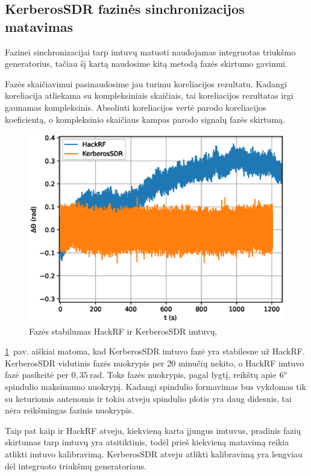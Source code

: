 \documentclass[main.tex]{subfiles}
\begin{document}
\subsection{KerberosSDR fazinės sinchronizacijos matavimas}\label{sec:phase_stability_sdr}

Fazinei sinchronizacijai tarp imtuvų matuoti naudojamas integruotas triukšmo generatorius,
tačiau šį kartą naudosime kitą metodą fazės skirtumo gavimui.

Fazės skaičiavimui pasinaudosime jau turimu koreliacijos rezultatu. Kadangi koreliacija
atliekama su kompleksiniais skaičiais, tai koreliacijos rezultatas irgi gaunamas kompleksinis.
Absoliuti koreliacijos vertė parodo koreliacijos koeficientą, o kompleksinio skaičiaus kampas
parodo signalų fazės skirtumą.

\begin{figure}[h]
    \begin{centering}
    \includegraphics[scale=1.0]{drawings/hackrdf_vs_kerberos_phase_over_time.eps}
    \par\end{centering}
    \protect\caption{\label{fig:phase_stability}Fazės stabilumas HackRF ir KerberosSDR imtuvų.}
\end{figure}

\ref{fig:phase_stability}~pav. aiškiai matoma, kad KerberosSDR imtuvo fazė yra 
stabilesne už HackRF. KerberosSDR vidutinis fazės nuokrypis per 20 minučių nekito,
o HackRF imtuvo fazė pasikeitė per $0,35\ \mathrm{rad}$. Toks fazės nuokrypis, pagal
 lygtį, reikštų apie $6\degree$ spindulio maksimumo nuokrypį.
Kadangi spindulio formavimas bus vykdomas tik su keturiomis antenomis ir tokiu atveju
spindulio plotis yra daug didesnis, tai nėra reikšmingas fazinis nuokrypis.

Taip pat kaip ir HackRF atveju, kiekvieną karta įjungus imtuvus, pradinis fazių skirtumas
tarp imtuvų yra atsitiktinis, todėl prieš kiekvieną matavimą reikia atlikti imtuvo kalibravimą.
KerberosSDR atveju atlikti kalibravimą yra lengviau dėl integruoto triukšmų generatoriaus.
\end{document}
